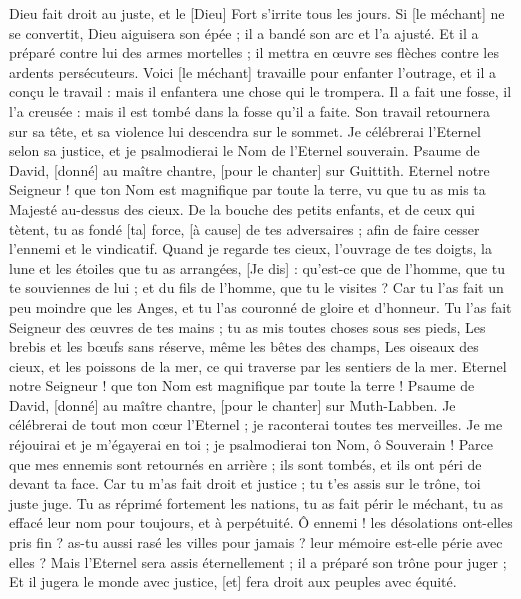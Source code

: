 \begin{multicols}{2}
Dieu fait droit au juste, et le [Dieu] Fort s'irrite tous les jours.
Si [le méchant] ne se convertit, Dieu aiguisera son épée ; il a bandé son arc et l'a ajusté.
Et il a préparé contre lui des armes mortelles ; il mettra en œuvre ses flèches contre les ardents persécuteurs.
Voici [le méchant] travaille pour enfanter l'outrage, et il a conçu le travail : mais il enfantera une chose qui le trompera.
Il a fait une fosse, il l'a creusée : mais il est tombé dans la fosse qu'il a faite.
Son travail retournera sur sa tête, et sa violence lui descendra sur le sommet.
Je célébrerai l'Eternel selon sa justice, et je psalmodierai le Nom de l’Eternel souverain.
\VerseOne{}Psaume de David, [donné] au maître chantre, [pour le chanter] sur Guittith. Eternel notre Seigneur ! que ton Nom est magnifique par toute la terre, vu que tu as mis ta Majesté au-dessus des cieux.
De la bouche des petits enfants, et de ceux qui tètent, tu as fondé [ta] force, [à cause] de tes adversaires ; afin de faire cesser l'ennemi et le vindicatif.
Quand je regarde tes cieux, l'ouvrage de tes doigts, la lune et les étoiles que tu as arrangées,
[Je dis] : qu'est-ce que de l'homme, que tu te souviennes de lui ; et du fils de l'homme, que tu le visites ?
Car tu l'as fait un peu moindre que les Anges, et tu l'as couronné de gloire et d'honneur.
Tu l'as fait Seigneur des œuvres de tes mains ; tu as mis toutes choses sous ses pieds,
Les brebis et les bœufs sans réserve, même les bêtes des champs,
Les oiseaux des cieux, et les poissons de la mer, ce qui traverse par les sentiers de la mer.
Eternel notre Seigneur ! que ton Nom est magnifique par toute la terre !
\VerseOne{}Psaume de David, [donné] au maître chantre, [pour le chanter] sur Muth-Labben. Je célébrerai de tout mon cœur l'Eternel ; je raconterai toutes tes merveilles.
Je me réjouirai et je m'égayerai en toi ; je psalmodierai ton Nom, ô Souverain !
Parce que mes ennemis sont retournés en arrière ; ils sont tombés, et ils ont péri de devant ta face.
Car tu m'as fait droit et justice ; tu t'es assis sur le trône, toi juste juge.
Tu as réprimé fortement les nations, tu as fait périr le méchant, tu as effacé leur nom pour toujours, et à perpétuité.
Ô ennemi ! les désolations ont-elles pris fin ? as-tu aussi rasé les villes pour jamais ? leur mémoire est-elle périe avec elles ?
Mais l'Eternel sera assis éternellement ; il a préparé son trône pour juger ;
Et il jugera le monde avec justice, [et] fera droit aux peuples avec équité.

\end{multicols}
